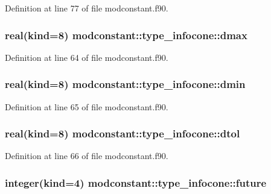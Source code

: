 Definition at line 77 of file modconstant.\-f90.

\hypertarget{structmodconstant_1_1type__infocone_af05af8480c2822e1a826aa9f178cc03e}{
\subsubsection[{dmax}]{\setlength{\rightskip}{0pt plus 5cm}real(kind=8) modconstant\-::type\-\_\-infocone\-::dmax}}\label{structmodconstant_1_1type__infocone_af05af8480c2822e1a826aa9f178cc03e}


Definition at line 64 of file modconstant.\-f90.

\hypertarget{structmodconstant_1_1type__infocone_aabcbf5e2b15937b2ffbc97cfdc173fa3}{
\subsubsection[{dmin}]{\setlength{\rightskip}{0pt plus 5cm}real(kind=8) modconstant\-::type\-\_\-infocone\-::dmin}}\label{structmodconstant_1_1type__infocone_aabcbf5e2b15937b2ffbc97cfdc173fa3}


Definition at line 65 of file modconstant.\-f90.

\hypertarget{structmodconstant_1_1type__infocone_a97f5dd3ae60da146ad5f2f6f76e60b18}{
\subsubsection[{dtol}]{\setlength{\rightskip}{0pt plus 5cm}real(kind=8) modconstant\-::type\-\_\-infocone\-::dtol}}\label{structmodconstant_1_1type__infocone_a97f5dd3ae60da146ad5f2f6f76e60b18}


Definition at line 66 of file modconstant.\-f90.

\hypertarget{structmodconstant_1_1type__infocone_a1fcb4dfca22f5cdb9979317636506751}{
\subsubsection[{future}]{\setlength{\rightskip}{0pt plus 5cm}integer(kind=4) modconstant\-::type\-\_\-infocone\-::future}}\label{structmodconstant_1_1type__infocone_a1fcb4dfca22f5cdb9979317636506751}


